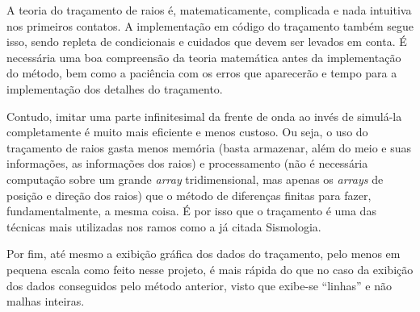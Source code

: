             A teoria do traçamento de raios é, matematicamente, complicada e nada intuitiva nos primeiros contatos. A implementação em código do traçamento também segue isso, sendo repleta de condicionais e cuidados que devem ser levados em conta. É necessária uma boa compreensão da teoria matemática antes da implementação do método, bem como a paciência com os erros que aparecerão e tempo para a implementação dos detalhes do traçamento.
            
            Contudo, imitar uma parte infinitesimal da frente de onda ao invés de simulá-la completamente é muito mais eficiente e menos custoso. Ou seja, o uso do traçamento de raios gasta menos memória (basta armazenar, além do meio e suas informações, as informações dos raios) e processamento (não é necessária computação sobre um grande \textit{array} tridimensional, mas apenas os \textit{arrays} de posição e direção dos raios) que o método de diferenças finitas para fazer, fundamentalmente, a mesma coisa. É por isso que o traçamento é uma das técnicas mais utilizadas nos ramos como a já citada Sismologia.
            
            Por fim, até mesmo a exibição gráfica dos dados do traçamento, pelo menos em pequena escala como feito nesse projeto, é mais rápida do que no caso da exibição dos dados conseguidos pelo método anterior, visto que exibe-se ``linhas'' e não malhas inteiras.